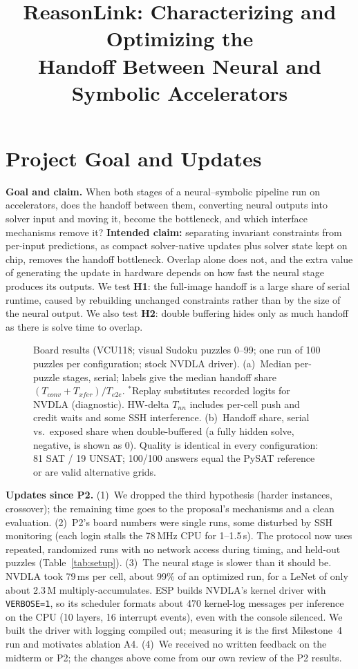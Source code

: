 \documentclass[conference,10pt,letterpaper]{IEEEtran}
\title{ReasonLink: Characterizing and Optimizing the\\Handoff Between Neural and Symbolic Accelerators}
\author{\IEEEauthorblockN{Vayun Gupta (vg2684), Aaron Mano Cherian (amc2535)}
\IEEEauthorblockA{COMS 6998: AI-Native Computing $\mid$ Fall 2026\\
P3: Evaluation Plan \& Initial Results $\mid$ Due November 25, 2026, 11:59 PM ET}}
\begin{document}
\maketitle
\thispagestyle{plain}
\pagestyle{plain}

\section{Project Goal and Updates}
\textbf{Goal and claim.} When both stages of a neural--symbolic pipeline run on accelerators, does the handoff between them, converting neural outputs into solver input and moving it, become the bottleneck, and which interface mechanisms remove it? \textbf{Intended claim:} separating invariant constraints from per-input predictions, as compact solver-native updates plus solver state kept on chip, removes the handoff bottleneck. Overlap alone does not, and the extra value of generating the update in hardware depends on how fast the neural stage produces its outputs. We test \textbf{H1}: the full-image handoff is a large share of serial runtime, caused by rebuilding unchanged constraints rather than by the size of the neural output. We also test \textbf{H2}: double buffering hides only as much handoff as there is solve time to overlap.

\begin{figure}[t]
\centering

\caption{Board results (VCU118; visual Sudoku puzzles 0--99; one run of 100 puzzles per configuration; stock NVDLA driver). (a)~Median per-puzzle stages, serial; labels give the median handoff share $(T_{conv}{+}T_{xfer})/T_{e2e}$. $^\ast$Replay substitutes recorded logits for NVDLA (diagnostic). HW-delta $T_{nn}$ includes per-cell push and credit waits and some SSH interference. (b)~Handoff share, serial vs.\ exposed share when double-buffered (a fully hidden solve, negative, is shown as 0). Quality is identical in every configuration: 81 SAT / 19 UNSAT; 100/100 answers equal the PySAT reference or are valid alternative grids.}
\label{fig:res}
\end{figure}

\textbf{Updates since P2.} (1)~We dropped the third hypothesis (harder instances, crossover); the remaining time goes to the proposal's mechanisms and a clean evaluation. (2)~P2's board numbers were single runs, some disturbed by SSH monitoring (each login stalls the 78\,MHz CPU for 1--1.5\,s). The protocol now uses repeated, randomized runs with no network access during timing, and held-out puzzles (Table~\ref{tab:setup}). (3)~The neural stage is slower than it should be. NVDLA took 79\,ms per cell, about 99\% of an optimized run, for a LeNet of only about 2.3\,M multiply-accumulates. ESP builds NVDLA's kernel driver with \texttt{VERBOSE=1}, so its scheduler formats about 470 kernel-log messages per inference on the CPU (10 layers, 16 interrupt events), even with the console silenced. We built the driver with logging compiled out; measuring it is the first Milestone~4 run and motivates ablation A4. (4)~We received no written feedback on the midterm or P2; the changes above come from our own review of the P2 results.
\end{document}
